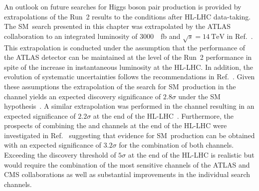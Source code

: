 An outlook on future searches for Higgs boson pair production is provided by
extrapolations of the Run~2 results to the conditions after HL-LHC
data-taking. The SM~\HH search presented in this chapter was extrapolated by the
ATLAS collaboration to an integrated luminosity of \SI{3000}{\per\femto\barn}
and $\sqrt{s} = \SI{14}{\TeV}$ in Ref.~\cite{ATL-PHYS-PUB-2021-044}. This
extrapolation is conducted under the assumption that the performance of the
ATLAS detector can be maintained at the level of the Run~2 performance in spite
of the increase in instantaneous luminosity at the HL-LHC. In addition, the
evolution of systematic uncertainties follows the recommendations in
Ref.~\cite{ATL-PHYS-PUB-2019-005}. Given these assumptions the extrapolation of
the search for SM~\HH production in the \bbtautau channel yields an expected
discovery significance of $2.8 \sigma$ under the SM
hypothesis~\cite{ATL-PHYS-PUB-2021-044}.
A similar extrapolation was performed in the \bbyy channel resulting in an
expected significance of $2.2 \sigma$ at the end of the
HL-LHC~\cite{ATL-PHYS-PUB-2022-001}. Furthermore, the prospects of combining the
\bbtautau and \bbyy channels at the end of the HL-LHC were investigated in
Ref.~\cite{ATL-PHYS-PUB-2022-005} suggesting that evidence for SM~\HH production
can be obtained with an expected significance of $3.2 \sigma$ for the
combination of both channels. Exceeding the discovery threshold of $5 \sigma$ at
the end of the HL-LHC is realistic but would require the combination of the most
sensitive channels of the ATLAS and CMS collaborations as well as substantial
improvements in the individual search channels.


